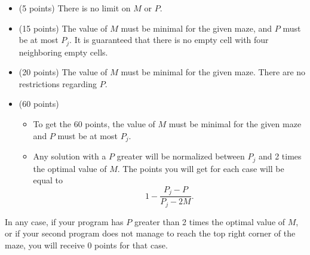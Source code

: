 \documentclass[12pt]{scrartcl}
\begin{document}
    \begin{itemize}
        \item (5 points) There is no limit on $M$ or $P$.
        \item (15 points) The value of $M$ must be minimal for the given maze, and $P$ must be at most $P_j$. It is guaranteed that there is no empty cell with four neighboring empty cells.
        \item (20 points) The value of $M$ must be minimal for the given maze. There are no restrictions regarding $P$.
        \item (60 points)
        \begin{itemize}
            \item To get the 60 points, the value of $M$ must be minimal for the given maze and $P$ must be at most $P_j$.
            \item Any solution with a $P$ greater will be normalized between $P_j$ and 2 times the optimal value of $M$. The points you will get for each case will be equal to
            \[1 - \frac{P_j - P}{P_j - 2M}.\]
        \end{itemize}
    \end{itemize}
    In any case, if your program has $P$ greater than 2 times the optimal value of $M$, or if your second program does not manage to reach the top right corner of the maze, you will receive 0 points for that case.
\end{document}
